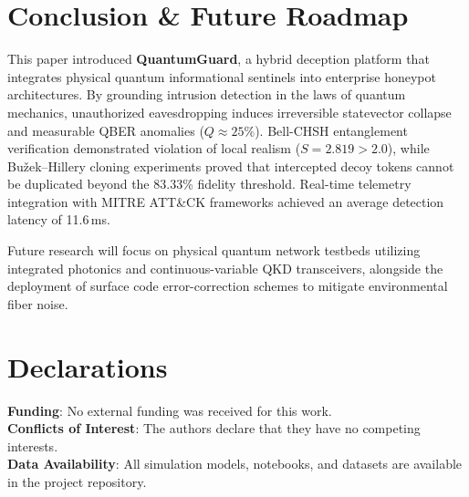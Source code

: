 \documentclass[pdflatex,sn-mathphys-num]{sn-jnl}
\theoremstyle{thmstyleone}
\theoremstyle{thmstyletwo}
\theoremstyle{thmstylethree}
\begin{document}
\section{Conclusion & Future Roadmap}\label{sec:conclusion}

This paper introduced \textbf{QuantumGuard}, a hybrid deception platform that integrates physical quantum informational sentinels into enterprise honeypot architectures. By grounding intrusion detection in the laws of quantum mechanics, unauthorized eavesdropping induces irreversible statevector collapse and measurable QBER anomalies ($Q \approx 25\%$). Bell-CHSH entanglement verification demonstrated violation of local realism ($S = 2.819 > 2.0$), while Bužek--Hillery cloning experiments proved that intercepted decoy tokens cannot be duplicated beyond the 83.33\% fidelity threshold. Real-time telemetry integration with MITRE ATT\&CK frameworks achieved an average detection latency of 11.6\,ms.

Future research will focus on physical quantum network testbeds utilizing integrated photonics and continuous-variable QKD transceivers, alongside the deployment of surface code error-correction schemes to mitigate environmental fiber noise.

\backmatter

\section*{Declarations}
\textbf{Funding}: No external funding was received for this work.\\
\textbf{Conflicts of Interest}: The authors declare that they have no competing interests.\\
\textbf{Data Availability}: All simulation models, notebooks, and datasets are available in the project repository.


\end{document}
